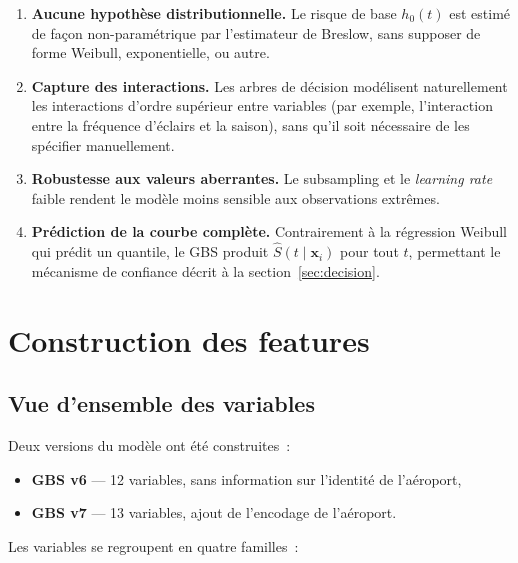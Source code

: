 \documentclass[a4paper,11pt]{article}
\newcommand{\Ssurvival}{S}
\begin{document}
\begin{enumerate}[leftmargin=1.8em, label=\textbf{\arabic*.}]
  \item \textbf{Aucune hypothèse distributionnelle.} Le risque de base $h_0(t)$ est estimé de
    façon non-paramétrique par l'estimateur de Breslow, sans supposer de forme Weibull, exponentielle,
    ou autre.

  \item \textbf{Capture des interactions.} Les arbres de décision modélisent naturellement les
    interactions d'ordre supérieur entre variables (par exemple, l'interaction entre la fréquence
    d'éclairs et la saison), sans qu'il soit nécessaire de les spécifier manuellement.

  \item \textbf{Robustesse aux valeurs aberrantes.} Le subsampling et le \emph{learning rate}
    faible rendent le modèle moins sensible aux observations extrêmes.

  \item \textbf{Prédiction de la courbe complète.} Contrairement à la régression Weibull qui
    prédit un quantile, le GBS produit $\hat{\Ssurvival}(t \mid \mathbf{x}_i)$ pour tout $t$,
    permettant le mécanisme de confiance décrit à la section~\ref{sec:decision}.
\end{enumerate}

\section{Construction des features}

\subsection{Vue d'ensemble des variables}

Deux versions du modèle ont été construites~:
\begin{itemize}[leftmargin=1.8em]
  \item \textbf{GBS v6} --- 12 variables, sans information sur l'identité de l'aéroport,
  \item \textbf{GBS v7} --- 13 variables, ajout de l'encodage de l'aéroport.
\end{itemize}

Les variables se regroupent en quatre familles~:
\end{document}
